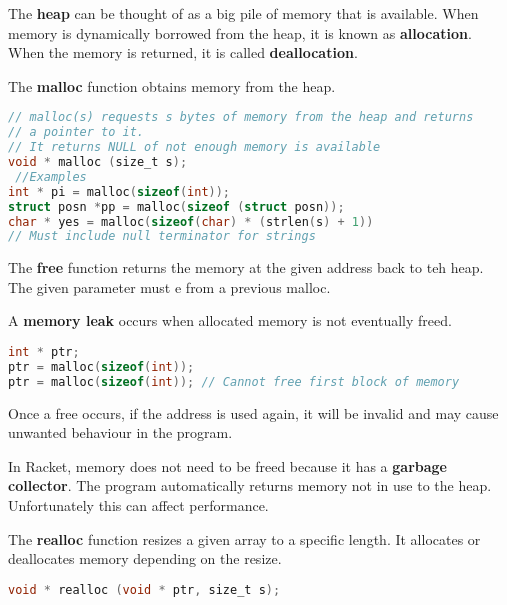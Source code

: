 \documentclass[english, 12pt]{article}
\begin{document}
\begin{defn}
The \textbf{heap} can be thought of as a big pile of memory that is available. When memory is dynamically borrowed from the heap, it is known as \textbf{allocation}. When the memory is returned, it is called \textbf{deallocation}.
\end{defn}

\begin{defn}
The \textbf{malloc} function obtains memory from the heap.
\begin{lstlisting}[language=C]
// malloc(s) requests s bytes of memory from the heap and returns
// a pointer to it.
// It returns NULL of not enough memory is available
void * malloc (size_t s);
 //Examples
int * pi = malloc(sizeof(int));
struct posn *pp = malloc(sizeof (struct posn));
char * yes = malloc(sizeof(char) * (strlen(s) + 1))
// Must include null terminator for strings
\end{lstlisting}
\end{defn}

\begin{defn}
The \textbf{free} function returns the memory at the given address back to teh heap. The given parameter must e from a previous malloc.
\end{defn}

\begin{defn}
A \textbf{memory leak} occurs when allocated memory is not eventually freed.
\begin{lstlisting}[language=C]
int * ptr;
ptr = malloc(sizeof(int));
ptr = malloc(sizeof(int)); // Cannot free first block of memory
\end{lstlisting}
Once a free occurs, if the address is used again, it will be invalid and may cause unwanted behaviour in the program.
\end{defn}

\begin{defn}
In Racket, memory does not need to be freed because it has a \textbf{garbage collector}. The program automatically returns memory not in use to the heap. Unfortunately this can affect performance.
\end{defn}

\begin{defn}
The \textbf{realloc} function resizes a given array to a specific length. It allocates or deallocates memory depending on the resize.
\begin{lstlisting}[language=C]
void * realloc (void * ptr, size_t s);
\end{lstlisting}
\end{defn}
\end{document}
